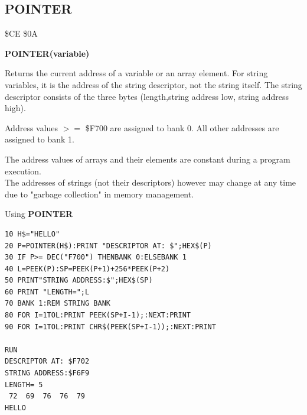 \subsection{POINTER}
\begin{description}[leftmargin=2cm,style=nextline]
\item [Token:] \$CE \$0A
\item [Format:] {\bf POINTER(variable)}
\item [Usage:]  Returns the current address of a variable
                or an array element.
                For string variables, it is the address of
                the string descriptor, not the string itself.
                The string descriptor consists of the three bytes
                (length,string address low, string address high).

                Address values $>=$ \$F700 are assigned to bank 0.
                All other addresses are assigned to bank 1.

\item [Remarks:] The address values of arrays and their elements
                 are constant during a program execution. \\
                 The addresses of strings (not their descriptors)
                 however may change at any time due to
                 "garbage collection" in memory management.


\item [Example:] Using {\bf POINTER}

\begin{tcolorbox}[colback=black,coltext=white]
\verbatimfont{\codefont}
\begin{verbatim}
10 H$="HELLO"
20 P=POINTER(H$):PRINT "DESCRIPTOR AT: $";HEX$(P)
30 IF P>= DEC("F700") THENBANK 0:ELSEBANK 1
40 L=PEEK(P):SP=PEEK(P+1)+256*PEEK(P+2)
50 PRINT"STRING ADDRESS:$";HEX$(SP)
60 PRINT "LENGTH=";L
70 BANK 1:REM STRING BANK
80 FOR I=1TOL:PRINT PEEK(SP+I-1);:NEXT:PRINT
90 FOR I=1TOL:PRINT CHR$(PEEK(SP+I-1));:NEXT:PRINT

RUN
DESCRIPTOR AT: $F702
STRING ADDRESS:$F6F9
LENGTH= 5
 72  69  76  76  79
HELLO
\end{verbatim}
\end{tcolorbox}
\end{description}


\newpage
